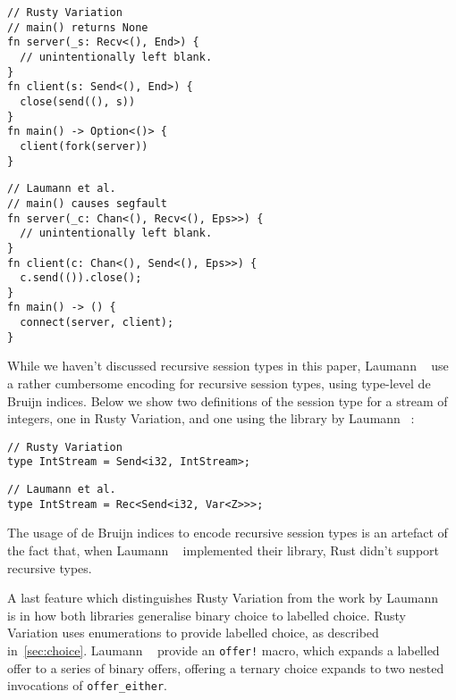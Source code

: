 \documentclass[copyright,creativecommons]{eptcs}
\begin{document}
\vspace{-0.5\baselineskip}
\begin{minipage}[t]{0.5\linewidth}
\begin{lstlisting}
// Rusty Variation
// main() returns None
fn server(_s: Recv<(), End>) {
  // unintentionally left blank.
}
fn client(s: Send<(), End>) {
  close(send((), s))
}
fn main() -> Option<()> {
  client(fork(server))
}
\end{lstlisting}
\end{minipage}%
\begin{minipage}[t]{0.5\linewidth}
\begin{lstlisting}
// Laumann et al.
// main() causes segfault
fn server(_c: Chan<(), Recv<(), Eps>>) {
  // unintentionally left blank.
}
fn client(c: Chan<(), Send<(), Eps>>) {
  c.send(()).close();
}
fn main() -> () {
  connect(server, client);
}
\end{lstlisting}
\end{minipage}
\vspace{-0.25\baselineskip}

While we haven't discussed recursive session types in this paper, Laumann \etal~\cite{jespersen2015} use a rather cumbersome encoding for recursive session types, using type-level de Bruijn indices. Below we show two definitions of the session type for a stream of integers, one in Rusty Variation, and one using the library by Laumann \etal~\cite{jespersen2015}:

\begin{minipage}{0.5\linewidth}
\begin{lstlisting}
// Rusty Variation
type IntStream = Send<i32, IntStream>;
\end{lstlisting}  
\end{minipage}%
\begin{minipage}{0.5\linewidth}
\begin{lstlisting}
// Laumann et al.
type IntStream = Rec<Send<i32, Var<Z>>>;
\end{lstlisting}  
\end{minipage}
\vspace{-0.25\baselineskip}

\noindent
The usage of de Bruijn indices to encode recursive session types is an artefact of the fact that, when Laumann \etal~\cite{jespersen2015} implemented their library, Rust didn't support recursive types.

A last feature which distinguishes Rusty Variation from the work by Laumann \etal~\cite{jespersen2015} is in how both libraries generalise binary choice to labelled choice. Rusty Variation uses enumerations to provide labelled choice, as described in~\cref{sec:choice}. Laumann \etal~\cite{jespersen2015} provide an \lstinline{offer!} macro, which expands a labelled offer to a series of binary offers, \eg offering a ternary choice expands to two nested invocations of \lstinline{offer_either}.
\end{document}
